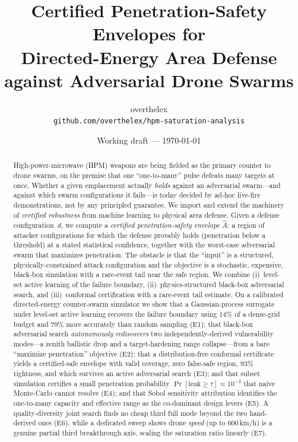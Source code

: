 \documentclass[11pt]{article}
\title{\bfseries Certified Penetration-Safety Envelopes for\\
Directed-Energy Area Defense against Adversarial Drone Swarms}
\author{overthelex\\ \small\texttt{github.com/overthelex/hpm-saturation-analysis}}
\date{Working draft --- \today}
\begin{document}
\maketitle

\begin{abstract}
High-power-microwave (HPM) weapons are being fielded as the primary counter to drone swarms,
on the premise that one ``one-to-many'' pulse defeats many targets at once. Whether a given
emplacement actually \emph{holds} against an adversarial swarm---and against which swarm
configurations it fails---is today decided by ad-hoc live-fire demonstrations, not by any
principled guarantee. We import and extend the machinery of \emph{certified robustness} from
machine learning to physical area defense. Given a defense configuration~$d$, we compute a
\emph{certified penetration-safety envelope} $\hat{A}$: a region of attacker configurations
for which the defense provably holds (penetration below a threshold) at a stated statistical
confidence, together with the worst-case adversarial swarm that maximizes penetration. The
obstacle is that the ``input'' is a structured, physically-constrained attack configuration
and the objective is a stochastic, expensive, black-box simulation with a rare-event tail
near the safe region. We combine (i)~level-set active learning of the failure boundary,
(ii)~physics-structured black-box adversarial search, and (iii)~conformal certification with a
rare-event tail estimate. On a calibrated directed-energy counter-swarm simulator we show that
a Gaussian-process surrogate under level-set active learning recovers the failure boundary
using $14\%$ of a dense-grid budget and $79\%$ more accurately than random sampling (E1); that
black-box adversarial search \emph{autonomously rediscovers} two independently-derived
vulnerability modes---a zenith ballistic drop and a target-hardening range collapse---from a
bare ``maximize penetration'' objective (E2); that a distribution-free conformal certificate
yields a certified-safe envelope with valid coverage, zero false-safe region, $93\%$
tightness, and which survives an active adversarial search (E3); and that subset simulation
certifies a small penetration probability $\Pr[\text{leak}\ge\tau]\approx10^{-3}$ that naive
Monte-Carlo cannot resolve (E4); and that Sobol sensitivity attribution identifies the
one-to-many capacity and effective range as the co-dominant design levers (E5). A
quality-diversity joint search finds no cheap third full mode beyond the two hand-derived ones
(E6), while a dedicated sweep shows drone \emph{speed} (up to 600\,km/h) is a genuine partial
third breakthrough axis, scaling the saturation ratio linearly (E7).
\end{abstract}
\end{document}
